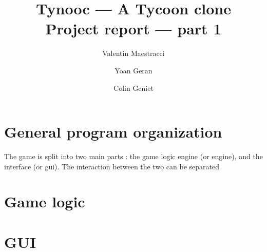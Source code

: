 \documentclass{article}
\begin{document}
\title{Tynooc --- A Tycoon clone \\ \large{Project report --- part 1}}
\author{Valentin Maestracci \and Yoan Geran \and Colin Geniet}
\maketitle

\tableofcontents

\section{General program organization}
The game is split into two main parts : the game logic engine (or engine), and the interface (or gui).
The interaction between the two can be separated 
\begin{itemize}
\end{itemize}


\section{Game logic}


\section{GUI}
\end{document}

